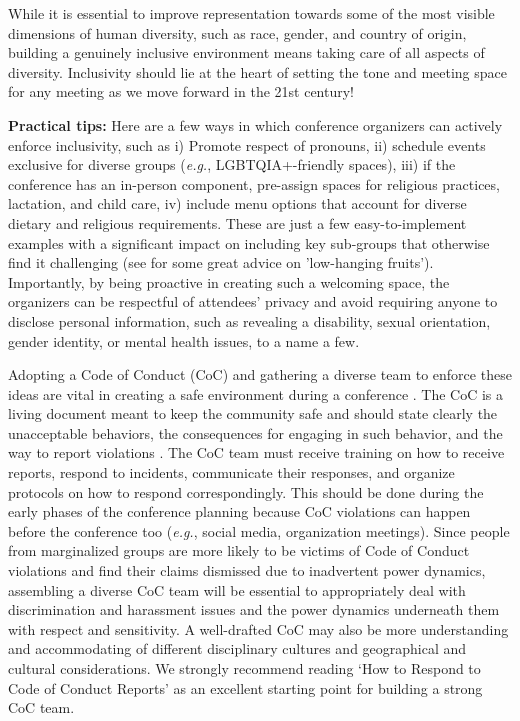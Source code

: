 \documentclass[10pt,letterpaper]{article}
\begin{document}
While it is essential to improve representation towards some of the most visible dimensions of human diversity, such as race, gender, and country of origin, building a genuinely inclusive environment means taking care of all aspects of diversity. Inclusivity should lie at the heart of setting the tone and meeting space for any meeting as we move forward in the 21st century!

 \textbf{Practical tips:} Here are a few ways in which conference organizers can actively enforce inclusivity, such as i) Promote respect of pronouns, ii) schedule events exclusive for diverse groups (\textit{e.g.}, LGBTQIA+-friendly spaces), iii) if the conference has an in-person component, pre-assign spaces for religious practices, lactation, and child care, iv) include menu options that account for diverse dietary and religious requirements. These are just a few easy-to-implement examples with a significant impact on including key sub-groups that otherwise find it challenging (see \cite{noauthor_discover2021} for some great advice on 'low-hanging fruits').
Importantly, by being proactive in creating such a welcoming space, the organizers can be respectful of attendees' privacy and avoid requiring anyone to disclose personal information, such as revealing a disability, sexual orientation, gender identity, or mental health issues, to a name a few.

Adopting a Code of Conduct (CoC) and gathering a diverse team to enforce these ideas are vital in creating a safe environment during a conference \cite{favaroYourScienceConference2016}.
The CoC is a living document meant to keep the community safe and should state clearly the unacceptable behaviors, the consequences for engaging in such behavior, and the way to report violations \cite{auroraHowRespondCode2019}. 
The CoC team must receive training on how to receive reports, respond to incidents, communicate their responses, and organize protocols on how to respond correspondingly. This should be done during the early phases of the conference planning because CoC violations can happen before the conference too (\textit{e.g.}, social media, organization meetings).  
Since people from marginalized groups are more likely to be victims of Code of Conduct violations and find their claims dismissed due to inadvertent power dynamics, assembling a diverse CoC team will be essential to appropriately deal with discrimination and harassment issues and the power dynamics underneath them with respect and sensitivity. A well-drafted CoC may also be more understanding and accommodating of different disciplinary cultures and geographical and cultural considerations. 
We strongly recommend reading `How to Respond to Code of Conduct Reports' \cite{auroraHowRespondCode2019} as an excellent starting point for building a strong CoC team.
 
\end{document}
